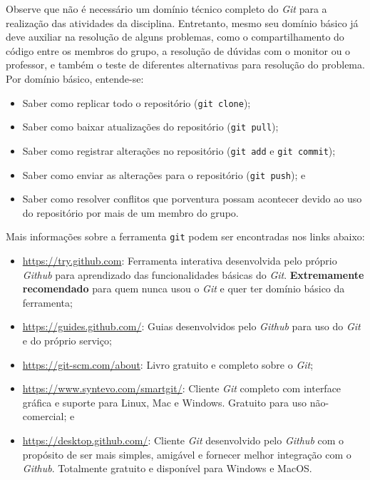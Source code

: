 \documentclass[11pt]{article}
\begin{document}
Observe que não é necessário um domínio técnico completo do \textit{Git} para a realização das atividades da disciplina. Entretanto, mesmo seu domínio básico já deve auxiliar na resolução de alguns problemas, como o compartilhamento do código entre os membros do grupo, a resolução de dúvidas com o monitor ou o professor, e também o teste de diferentes alternativas para resolução do problema. Por domínio básico, entende-se:

\begin{itemize}
  \item Saber como replicar todo o repositório (\texttt{git clone});
  \item Saber como baixar atualizações do repositório (\texttt{git pull});
  \item Saber como registrar alterações no repositório (\texttt{git add} e \texttt{git commit});
  \item Saber como enviar as alterações para o repositório (\texttt{git push}); e
  \item Saber como resolver conflitos que porventura possam acontecer devido ao uso do repositório por mais de um membro do grupo.
\end{itemize}

Mais informações sobre a ferramenta \texttt{git} podem ser encontradas nos links abaixo:

\begin{itemize}
\item \url{https://try.github.com}: Ferramenta interativa desenvolvida pelo próprio \textit{Github} para aprendizado das funcionalidades básicas do \textit{Git}. \textbf{Extremamente recomendado} para quem nunca usou o \textit{Git} e quer ter domínio básico da ferramenta;
\item \url{https://guides.github.com/}: Guias desenvolvidos pelo \textit{Github} para uso do \textit{Git} e do próprio serviço;
\item \url{https://git-scm.com/about}: Livro gratuito e completo sobre o \textit{Git};
\item \url{https://www.syntevo.com/smartgit/}: Cliente \textit{Git} completo com interface gráfica e suporte para Linux, Mac e Windows. Gratuito para uso não-comercial; e
\item \url{https://desktop.github.com/}: Cliente \textit{Git} desenvolvido pelo \textit{Github} com o propósito de ser mais simples, amigável e fornecer melhor integração com o \textit{Github}. Totalmente gratuito e disponível para Windows e MacOS.
\end{itemize}
\end{document}
